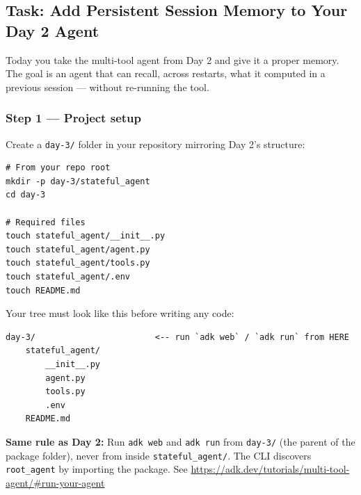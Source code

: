 \documentclass[12pt, a4paper]{article}
\begin{document}
\begin{practicalbox}

\subsection*{Task: Add Persistent Session Memory to Your Day 2 Agent}

Today you take the multi-tool agent from Day 2 and give it a proper memory.
The goal is an agent that can recall, across restarts, what it computed in a
previous session --- without re-running the tool.

\subsubsection*{Step 1 --- Project setup}


Create a \texttt{day-3/} folder in your repository mirroring Day 2's structure:

\begin{lstlisting}[style=bashstyle]
# From your repo root
mkdir -p day-3/stateful_agent
cd day-3

# Required files
touch stateful_agent/__init__.py
touch stateful_agent/agent.py
touch stateful_agent/tools.py
touch stateful_agent/.env
touch README.md
\end{lstlisting}

Your tree must look like this before writing any code:

\begin{lstlisting}[style=bashstyle]
day-3/                        <-- run `adk web` / `adk run` from HERE
    stateful_agent/
        __init__.py
        agent.py
        tools.py
        .env
    README.md
\end{lstlisting}

\begin{notebox}
\textbf{Same rule as Day 2:} Run \texttt{adk web} and \texttt{adk run} from
\texttt{day-3/} (the parent of the package folder), never from inside
\texttt{stateful\_agent/}. The CLI discovers \texttt{root\_agent} by importing
the package. See \url{https://adk.dev/tutorials/multi-tool-agent/\#run-your-agent}
\end{notebox}


\end{practicalbox}
\end{document}
